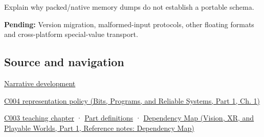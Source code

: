 \hypertarget{appendix-91d09ebed979-recall-and-next-depth}{}

Explain why packed/native memory dumps do not establish a portable schema.

\textbf{Pending:} Version migration, malformed-input protocols, other floating formats and cross-platform special-value transport.

\subsection{Source and navigation}\label{appendix-91d09ebed979-source-and-navigation}

\hypertarget{appendix-91d09ebed979-source-and-navigation}{}

\hyperref[01-foundations-i-ch002-bytes-become-a-durable-agreement]{Narrative development}

\href{../01-Bits-Programs-and-Reliable-Systems-P01/main.pdf\#01-foundations-i-ch001-a-stretching-ruler-for-real-valued-quantities}{C004 representation policy (Bits, Programs, and Reliable Systems, Part 1, Ch. 1)}

\hyperref[01-foundations-i-ch002-where-the-bytes-live]{C003 teaching chapter} · \hyperref[appendix-fd090d982a15-m003---parts-41-60]{Part definitions} · \href{../07-Vision-XR-and-Playable-Worlds-P01/main.pdf\#appendix-4ad47bdd269a}{Dependency Map (Vision, XR, and Playable Worlds, Part 1, Reference notes: Dependency Map)}
